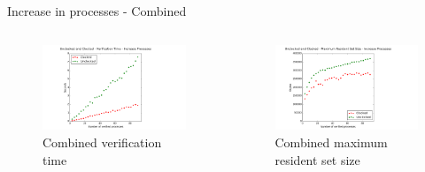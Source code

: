 \documentclass[11pt]{beamer}
\begin{document}
\begin{frame}{Increase in processes - Combined}
         \begin{columns}[t, totalwidth=1.02\textwidth]
             \begin{column}{0.50\linewidth}
\begin{figure}[!ht]
     \centering
     \includegraphics[scale=0.28]{figures/combined_verification_time_increase_proccess.png}
     \caption{Combined verification time}
\end{figure}
             \end{column}

             \begin{column}{0.50\linewidth}
\begin{figure}[!ht]
     \centering
     \includegraphics[scale=0.28]{figures/combined_size_time_increase_proccess.png}
     \caption{Combined maximum resident set size}
\end{figure}
             \end{column}

         \end{columns}

\end{frame}
\end{document}
